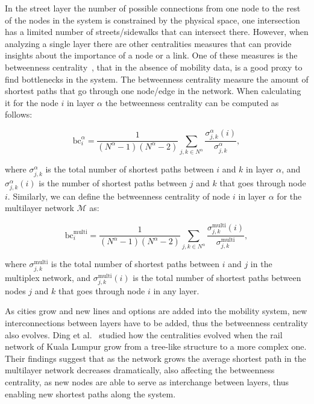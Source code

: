 In the street layer the number of possible connections from one node to the rest of the nodes in the system is constrained by the physical space, one intersection has a limited number of streets/sidewalks that can intersect there. However, when analyzing a single layer there are other centralities measures that can provide insights about the importance of a node or a link. One of these measures is the betweenness centrality~\cite{Freeman1977Centrality}, that in the absence of mobility data, is a good proxy to find bottlenecks in the system. The betweenness centrality measure the amount of shortest paths that go through one node/edge in the network. When calculating it for the node $i$ in layer $\alpha$ the betweenness centrality can be computed as follows:

\begin{equation}
     \text{bc}_i^\alpha=\frac{1}{(N^\alpha-1)(N^\alpha-2)}\sum_{j,k\in N^\alpha}\frac{\sigma_{j,k}^\alpha(i)}{\sigma_{j,k}^\alpha}, 
 \end{equation}

where $\sigma_{j,k}^\alpha$ is the total number of shortest paths between $i$ and $k$ in layer $\alpha$, and $\sigma_{j,k}^\alpha(i)$ is the number of shortest paths between $j$ and $k$ that goes through node $i$. Similarly, we can define the betweenness centrality of node $i$ in layer $\alpha$ for the multilayer network $\mathcal{M}$ as:

\begin{equation}
     \text{bc}_i^\text{multi}=\frac{1}{(N^\alpha-1)(N^\alpha-2)}\sum_{j,k\in N^\alpha}\frac{\sigma_{j,k}^\text{multi}(i)}{\sigma_{j,k}^\text{multi}}, 
\end{equation}

where $\sigma_{j,k}^\text{multi}$ is the total number of shortest paths between $i$ and $j$ in the multiplex network, and $\sigma_{j,k}^\text{multi}(i)$ is the total number of shortest paths between nodes $j$ and $k$ that goes through node $i$ in any layer.

As cities grow and new lines and options are added into the mobility system, new interconnections between layers have to be added, thus the betweenness centrality also evolves. Ding et al.~\cite{ding2018traffic} studied how the centralities evolved when the rail network of Kuala Lumpur grow from a tree-like structure to a more complex one. Their findings suggest that as the network grows the average shortest path in the multilayer network decreases dramatically, also affecting the betweenness centrality, as new nodes are able to serve as interchange between layers, thus enabling new shortest paths along the system.

